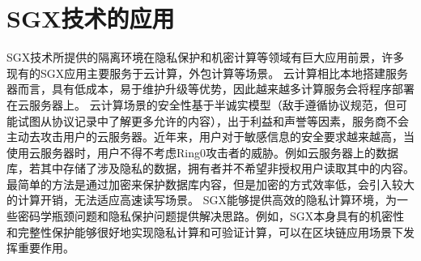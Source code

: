 \documentclass[twocolumn]{source/Paper}
\begin{document}
    \section{SGX技术的应用}
        SGX技术所提供的隔离环境在隐私保护和机密计算等领域有巨大应用前景，许多现有的SGX应用主要服务于云计算，外包计算等场景。
        云计算相比本地搭建服务器而言，具有低成本，易于维护升级等优势，因此越来越多计算服务会将程序部署在云服务器上。
        云计算场景的安全性基于半诚实模型（敌手遵循协议规范，但可能试图从协议记录中了解更多允许的内容），出于利益和声誉等因素，服务商不会主动去攻击用户的云服务器。近年来，用户对于敏感信息的安全要求越来越高，当使用云服务器时，用户不得不考虑Ring0攻击者的威胁。例如云服务器上的数据库，若其中存储了涉及隐私的数据，拥有者并不希望非授权用户读取其中的内容。最简单的方法是通过加密来保护数据库内容，但是加密的方式效率低，会引入较大的计算开销，无法适应高速读写场景。
        SGX能够提供高效的隐私计算环境，为一些密码学瓶颈问题和隐私保护问题提供解决思路。例如，SGX本身具有的机密性和完整性保护能够很好地实现隐私计算和可验证计算，可以在区块链应用场景下发挥重要作用。
\end{document}
